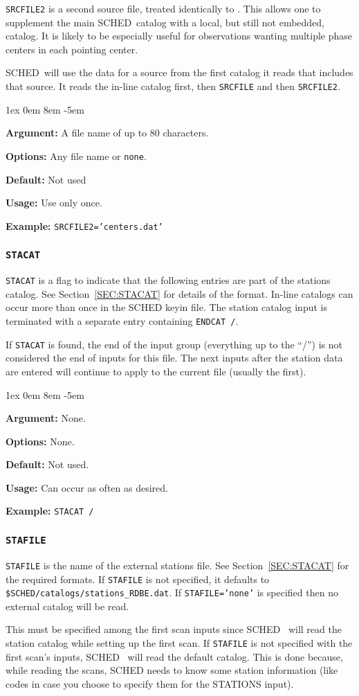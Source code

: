 \documentclass{report}
\newcommand{\schedb}{{\sc SCHED~}}
\newcommand{\rcwbox}[5]{
  \begin{list}{}{\parsep 1ex  \itemsep 0em
                 \leftmargin 8em  \itemindent -5em }
    \item {\bf Argument:} #1
    \item {\bf Options:}  #2
    \item {\bf Default:}  #3
    \item {\bf Usage:}    #4
    \item {\bf Example:}  #5
  \end{list}
}
\begin{document}
{\tt SRCFILE2} is a second source file, treated identically to
.  This allows one to supplement
the main \schedb catalog with a local, but still not embedded,
catalog.  It is likely to be especially useful for observations
wanting multiple phase centers in each pointing center.

\schedb will use the data for a source from the first catalog it
reads that includes that source.  It reads the in-line catalog first,
then {\tt SRCFILE} and then {\tt SRCFILE2}.

\rcwbox
{A file name of up to 80 characters.}
{Any file name or {\tt none}.}
{Not used}
{Use only once.}
{{\tt SRCFILE2='centers.dat'}}


\subsubsection{\label{MP:STACAT}{\tt STACAT}}

{\tt STACAT} is a flag to indicate that the following entries are part
of the stations catalog. See Section~\ref{SEC:STACAT} for details of
the format. In-line catalogs can occur more than once in the {\sc
SCHED} keyin file.  The station catalog input is terminated with a
separate entry containing {\tt ENDCAT /}.

If {\tt STACAT} is found, the end of the input group (everything up to
the ``/'') is not considered the end of inputs for this file.  The
next inputs after the station data are entered will continue to apply
to the current file (usually the first).

\rcwbox
{None.}
{None.}
{Not used.}
{Can occur as often as desired.}
{{\tt STACAT /}}


\subsubsection{\label{MP:STAFILE}{\tt STAFILE}}

{\tt STAFILE} is the name of the external stations file. See
Section~\ref{SEC:STACAT} for the required formats. If {\tt STAFILE} is
not specified, it defaults to {\tt
\$SCHED/catalogs/stations\_RDBE.dat}.  If {\tt STAFILE='none'} is
specified then no external catalog will be read.

This must be specified among the first scan inputs since \schedb
will read the station catalog while setting up the first scan.  If
{\tt STAFILE} is not specified with the first scan's inputs, \schedb
will read the default catalog.  This is done because, while reading
the scans, SCHED needs to know some station information (like codes
in case you choose to specify them for the STATIONS input).
\end{document}
